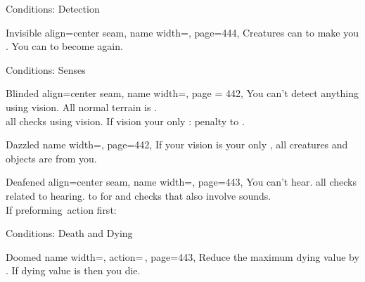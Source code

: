 \begin{PageFrontLandscape}
\begin{TablesHalf}{\frontTableHeight}
\begin{Table}{Conditions: Detection}
\begin{entry}{Invisible}{%
                align=center seam,
                name width=\conditionLength,%
                page=444,
            }
                Creatures can  to make you \Hidden. You can  to become \Undetected again.
                \hfill {}
            \end{entry}
        \end{Table}
        \TableSpace
        \begin{Table}{Conditions: Senses}
            \begin{entry}{Blinded}{%
                align=center seam,
                name width=\conditionLength,%
                page = 442,
            }
                You can't detect anything using vision. All normal terrain is .\hfill
                 \\
                 all \PerceptionT checks using vision.
                If vision your only \PreciseSense:  \Status penalty to \PerceptionT.\hfill
            \end{entry}
            \begin{entry}{Dazzled}{%
                name width=\conditionLength,%
                page=442,
            }
                If your vision is your only \PreciseSense, all creatures and objects are \Concealed from you.
            \end{entry}
            \begin{entry}{Deafened}{%
                align=center seam,
                name width=\conditionLength,%
                page=443,
            }
                You can't hear. \hfill
                 all checks \PerceptionT related to hearing. \hfill
                 to \PerceptionT for  and checks that also involve sounds. \\
                If preforming \Auditory\,action first: \Flat[][val=5]  \hfill
            \end{entry}
        \end{Table}
        \TableSpace
        \begin{Table}{Conditions: Death and Dying}
            \begin{entry}{Doomed}{%
                name width=\conditionLength,%
                action=\,\X,
                page=443,
            }
                Reduce the maximum dying value by \X.\quad
                If dying value is  then you die. \hfill

\end{entry}
\end{Table}
\end{TablesHalf}
\end{PageFrontLandscape}
